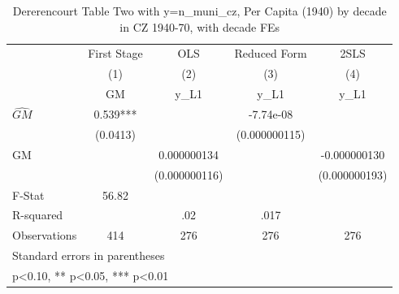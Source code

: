 \begin{table}[htbp]\centering
\def\sym#1{\ifmmode^{#1}\else\(^{#1}\)\fi}
\caption{Dererencourt Table Two with y=n\_muni\_cz, Per Capita (1940) by decade in CZ 1940-70, with decade FEs}
\begin{tabular}{l*{4}{c}}
\toprule
                    & First Stage   &         OLS   &Reduced Form   &        2SLS   \\
                    &\multicolumn{1}{c}{(1)}&\multicolumn{1}{c}{(2)}&\multicolumn{1}{c}{(3)}&\multicolumn{1}{c}{(4)}\\
                    &\multicolumn{1}{c}{GM}&\multicolumn{1}{c}{y\_L1}&\multicolumn{1}{c}{y\_L1}&\multicolumn{1}{c}{y\_L1}\\
\midrule
$\hat{GM}$          &       0.539***&               &   -7.74e-08   &               \\
                    &    (0.0413)   &               &(0.000000115)   &               \\
\addlinespace
GM                  &               & 0.000000134   &               &-0.000000130   \\
                    &               &(0.000000116)   &               &(0.000000193)   \\
\midrule
F-Stat              &       56.82   &               &               &               \\
R-squared           &               &         .02   &        .017   &               \\
Observations        &         414   &         276   &         276   &         276   \\
\bottomrule
\multicolumn{5}{l}{\footnotesize Standard errors in parentheses}\\
\multicolumn{5}{l}{\footnotesize * p<0.10, ** p<0.05, *** p<0.01}\\
\end{tabular}
\end{table}
